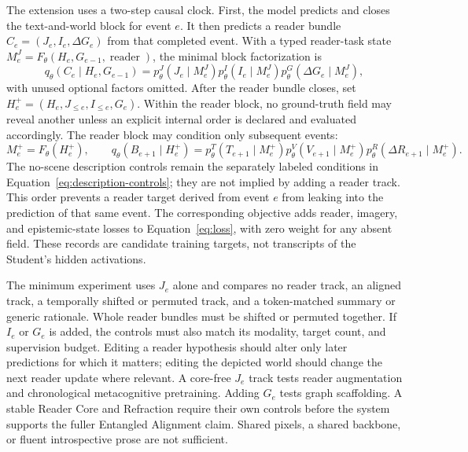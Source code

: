 \documentclass[11pt]{article}
\begin{document}
The extension uses a two-step causal clock. First, the model predicts and closes the text-and-world block for event $e$. It then predicts a reader bundle $C_e=(J_e,I_e,\Delta G_e)$ from that completed event. With a typed reader-task state $M_e^J=F_\theta(H_e,G_{e-1},\operatorname{reader})$, the minimal block factorization is
\begin{equation}
  q_\theta(C_e\mid H_e,G_{e-1})
  =p_\theta^J(J_e\mid M_e^J)
   p_\theta^I(I_e\mid M_e^J)
   p_\theta^G(\Delta G_e\mid M_e^J),
  \label{eq:reader}
\end{equation}
with unused optional factors omitted. After the reader bundle closes, set $H_e^+=(H_e,J_{\le e},I_{\le e},G_e)$. Within the reader block, no ground-truth field may reveal another unless an explicit internal order is declared and evaluated accordingly. The reader block may condition only subsequent events:
\begin{equation}
  M_e^+=F_\theta(H_e^+),\qquad
  q_\theta(B_{e+1}\mid H_e^+)
  =p_\theta^T(T_{e+1}\mid M_e^+)
   p_\theta^V(V_{e+1}\mid M_e^+)
   p_\theta^R(\Delta R_{e+1}\mid M_e^+).
  \label{eq:reader-next}
\end{equation}
The no-scene description controls remain the separately labeled conditions in Equation~\ref{eq:description-controls}; they are not implied by adding a reader track. This order prevents a reader target derived from event $e$ from leaking into the prediction of that same event. The corresponding objective adds reader, imagery, and epistemic-state losses to Equation~\ref{eq:loss}, with zero weight for any absent field. These records are candidate training targets, not transcripts of the Student's hidden activations.

The minimum experiment uses $J_e$ alone and compares no reader track, an aligned track, a temporally shifted or permuted track, and a token-matched summary or generic rationale. Whole reader bundles must be shifted or permuted together. If $I_e$ or $G_e$ is added, the controls must also match its modality, target count, and supervision budget. Editing a reader hypothesis should alter only later predictions for which it matters; editing the depicted world should change the next reader update where relevant. A core-free $J_e$ track tests reader augmentation and chronological metacognitive pretraining. Adding $G_e$ tests graph scaffolding. A stable Reader Core and Refraction require their own controls before the system supports the fuller Entangled Alignment claim. Shared pixels, a shared backbone, or fluent introspective prose are not sufficient.

\begingroup
\footnotesize


\endgroup
\end{document}
